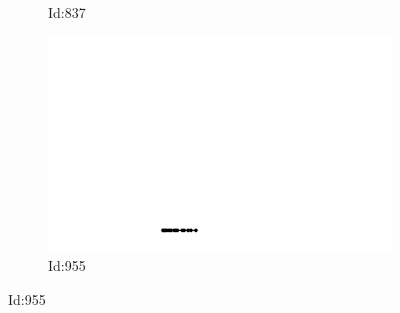 \documentclass[12pt,twoside]{report}
\begin{document}
\begin{figure}
\begin{subfigure}[b]{0.20\textwidth}
\caption{Id:837}
\end{subfigure}
\begin{subfigure}[b]{0.20\textwidth}
\centering
\includegraphics[width=\textwidth]{../../trajectories/955.png}
\caption{Id:955}
\end{subfigure}
\end{figure}
\end{document}
